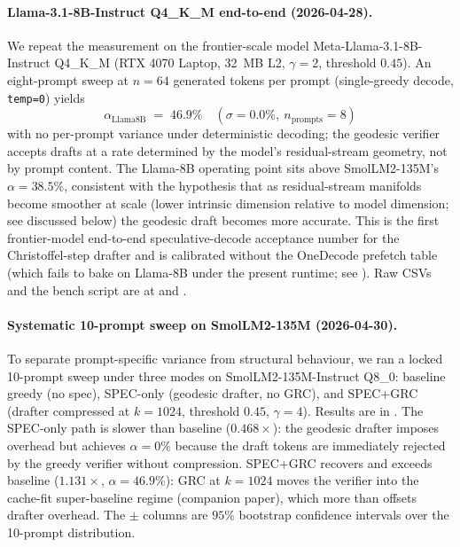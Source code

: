 \documentclass[11pt]{article}
\begin{document}
\paragraph{Llama-3.1-8B-Instruct Q4\_K\_M end-to-end (2026-04-28).}
We repeat the measurement on the frontier-scale model
Meta-Llama-3.1-8B-Instruct Q4\_K\_M (RTX 4070 Laptop, 32~MB L2,
$\gamma{=}2$, threshold $0.45$).  An eight-prompt sweep at $n{=}64$
generated tokens per prompt (single-greedy decode, \texttt{temp=0}) yields
\[
\alpha_\text{Llama8B} \;=\; 46.9\%\quad
(\sigma\!=\!0.0\%,\ n_\text{prompts}{=}8)
\]
with no per-prompt variance under deterministic decoding;
the geodesic verifier accepts drafts at a rate determined by the
model's residual-stream geometry, not by prompt content.
The Llama-8B operating point sits above SmolLM2-135M's
$\alpha{=}38.5\%$, consistent with the hypothesis that as residual-stream
manifolds become smoother at scale (lower intrinsic dimension relative
to model dimension; see discussed below) the geodesic draft becomes more
accurate.  This is the first frontier-model end-to-end speculative-decode
acceptance number for the Christoffel-step drafter and is calibrated
without the OneDecode prefetch table (which fails to bake on Llama-8B
under the present runtime; see ).
Raw CSVs and the bench script are at
 and
.

\paragraph{Systematic 10-prompt sweep on SmolLM2-135M (2026-04-30).}
To separate prompt-specific variance from structural behaviour, we ran a
locked 10-prompt sweep under three modes on SmolLM2-135M-Instruct Q8\_0:
baseline greedy (no spec), SPEC-only (geodesic drafter, no GRC), and
SPEC+GRC (drafter compressed at $k{=}1024$, threshold $0.45$,
$\gamma{=}4$).  Results are in .
The SPEC-only path is slower than baseline ($0.468\times$): the
geodesic drafter imposes overhead but achieves $\alpha{=}0\%$
because the draft tokens are immediately rejected by the greedy
verifier without compression.  SPEC+GRC recovers and exceeds baseline
($1.131\times$, $\alpha{=}46.9\%$): GRC at $k{=}1024$ moves the verifier
into the cache-fit super-baseline regime (companion paper), which
more than offsets drafter overhead.  The $\pm$ columns are $95\%$
bootstrap confidence intervals over the 10-prompt distribution.
\end{document}
